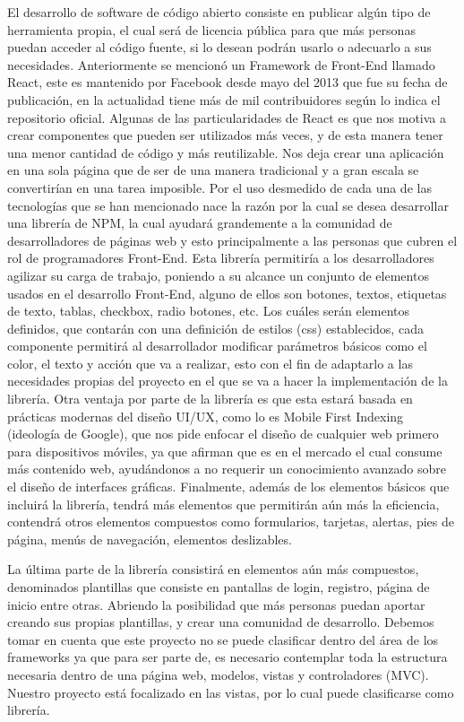 El desarrollo de software de código abierto \cite{openSource} consiste en publicar algún tipo de herramienta propia, el cual será de licencia pública para que más personas puedan acceder al código fuente, si lo desean podrán usarlo o adecuarlo a sus necesidades. 
Anteriormente se mencionó un Framework de Front-End llamado React, este es mantenido por Facebook desde mayo del 2013 que fue su fecha de publicación, en la actualidad tiene más de mil contribuidores según lo indica el repositorio oficial. 
Algunas de las particularidades de React  \cite{reactOreilly}es que nos motiva a crear componentes que pueden ser utilizados más veces, y de esta manera tener una menor cantidad de código y más reutilizable. 
Nos deja crear una aplicación en una sola página que de ser de una manera tradicional y a gran escala se convertirían en una tarea imposible.
\newline
Por el uso desmedido de cada una de las tecnologías que se han mencionado nace la razón por la cual se desea desarrollar una librería de NPM, la cual ayudará grandemente a la comunidad de desarrolladores de páginas web y esto principalmente a las personas que cubren el rol de programadores Front-End. 
Esta librería permitiría a los desarrolladores agilizar su carga de trabajo, poniendo a su alcance un conjunto de elementos usados en el desarrollo Front-End, alguno de ellos son botones, textos, etiquetas de texto, tablas, checkbox, radio botones, etc.  Los cuáles serán elementos definidos, que contarán con una definición de estilos \cite{scss} (css) establecidos, cada componente permitirá al desarrollador modificar parámetros básicos como el color, el texto y acción que va a realizar, esto con el fin de adaptarlo a las necesidades propias del proyecto en el que se va a hacer la implementación de la librería.  
Otra ventaja por parte de la librería es que esta estará basada en prácticas modernas del diseño UI/UX, como lo es Mobile First \cite{mobileFirst} Indexing (ideología de Google), que nos pide enfocar el diseño de cualquier web primero para dispositivos móviles, ya que afirman que es en el mercado el cual consume más contenido web, ayudándonos a no requerir un conocimiento avanzado sobre el diseño de interfaces gráficas. 
Finalmente, además de los elementos básicos que incluirá la librería, tendrá más elementos que permitirán aún más la eficiencia, contendrá otros elementos compuestos como formularios, tarjetas, alertas, pies de página, menús de navegación, elementos deslizables. 

La última parte de la librería consistirá en elementos aún más compuestos, denominados plantillas que consiste en pantallas de login, registro, página de inicio entre otras. Abriendo la posibilidad que más personas puedan aportar creando sus propias plantillas, y crear una comunidad de desarrollo.  
Debemos tomar en cuenta que este proyecto no se puede clasificar dentro del área de los frameworks ya que para ser parte de, es necesario contemplar toda la estructura necesaria dentro de una página web, modelos, vistas y controladores (MVC). Nuestro proyecto está focalizado en las vistas, por lo cual puede clasificarse como librería.  
  
